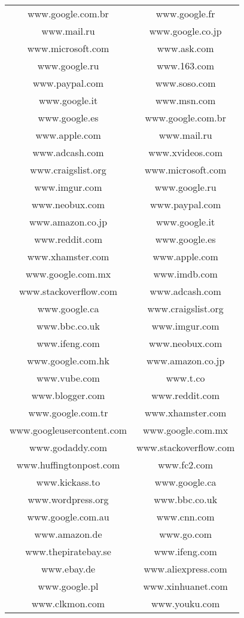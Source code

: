 \begin{longtable}{c c}
www.google.com.br & www.google.fr \\
www.mail.ru & www.google.co.jp \\
www.microsoft.com & www.ask.com \\
www.google.ru & www.163.com \\
www.paypal.com & www.soso.com \\
www.google.it & www.msn.com \\
www.google.es & www.google.com.br \\
www.apple.com & www.mail.ru \\
www.adcash.com & www.xvideos.com \\
www.craigslist.org & www.microsoft.com \\
www.imgur.com & www.google.ru \\
www.neobux.com & www.paypal.com \\
www.amazon.co.jp & www.google.it \\
www.reddit.com & www.google.es \\
www.xhamster.com & www.apple.com \\
www.google.com.mx & www.imdb.com \\
www.stackoverflow.com & www.adcash.com \\
www.google.ca & www.craigslist.org \\
www.bbc.co.uk & www.imgur.com \\
www.ifeng.com & www.neobux.com \\
www.google.com.hk & www.amazon.co.jp \\
www.vube.com & www.t.co \\
www.blogger.com & www.reddit.com \\
www.google.com.tr & www.xhamster.com \\
www.googleusercontent.com & www.google.com.mx \\
www.godaddy.com & www.stackoverflow.com \\
www.huffingtonpost.com & www.fc2.com \\
www.kickass.to & www.google.ca \\
www.wordpress.org & www.bbc.co.uk \\
www.google.com.au & www.cnn.com \\
www.amazon.de & www.go.com \\
www.thepiratebay.se & www.ifeng.com \\
www.ebay.de & www.aliexpress.com \\
www.google.pl & www.xinhuanet.com \\
www.clkmon.com & www.youku.com \\

\end{longtable}

